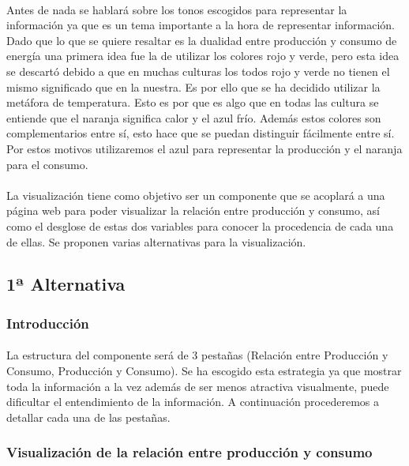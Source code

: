 \documentclass{article}
\begin{document}
		\paragraph{}
		Antes de nada se hablará sobre los tonos escogidos para representar la información ya que es un tema importante a la hora de representar información. Dado que lo que se quiere resaltar es la dualidad entre producción y consumo de energía una primera idea fue la de utilizar los colores rojo y verde, pero esta idea se descartó debido a que en muchas culturas los todos rojo y verde no tienen el mismo significado que en la nuestra. Es por ello que se ha decidido utilizar la metáfora de temperatura. Esto es por que es algo que en todas las cultura se entiende que el naranja significa calor y el azul frío. Además estos colores son  complementarios entre sí, esto hace que se puedan distinguir fácilmente entre sí. Por estos motivos utilizaremos el azul para representar la producción y el naranja para el consumo.
		
		\paragraph{}
		La visualización tiene como objetivo ser un componente que se acoplará a una página web para poder visualizar la relación entre producción y consumo, así como el desglose de estas dos variables para conocer la procedencia de cada una de ellas. Se proponen varias alternativas para la visualización.


		\subsection{1ª Alternativa}

			\subsubsection{Introducción}		

				\paragraph{}
				 La estructura del componente será de 3 pestañas (Relación entre Producción y Consumo, Producción y Consumo). Se ha escogido esta estrategia ya que mostrar toda la información a la vez además de ser menos atractiva visualmente, puede dificultar el entendimiento de la información. A continuación procederemos a detallar cada una de las pestañas.

			\subsubsection{Visualización de la relación entre producción y consumo}
\end{document}

